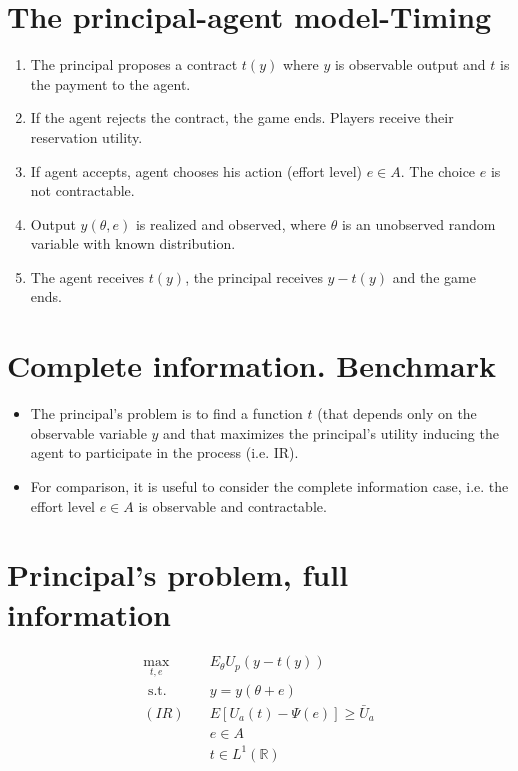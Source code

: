 \documentclass[10pt]{article}
\begin{document}
\section*{The principal-agent model-Timing}
\begin{enumerate}
  \item The principal proposes a contract $t(y)$ where $y$ is observable output and $t$ is the payment to the agent.
  \item If the agent rejects the contract, the game ends. Players receive their reservation utility.
  \item If agent accepts, agent chooses his action (effort level) $e \in A$. The choice $e$ is not contractable.
  \item Output $y(\theta, e)$ is realized and observed, where $\theta$ is an unobserved random variable with known distribution.
  \item The agent receives $t(y)$, the principal receives $y-t(y)$ and the game ends.
\end{enumerate}

\section*{Complete information. Benchmark}
\begin{itemize}
  \item The principal's problem is to find a function $t$ (that depends only on the observable variable $y$ and that maximizes the principal's utility inducing the agent to participate in the process (i.e. IR).
  \item For comparison, it is useful to consider the complete information case, i.e. the effort level $e \in A$ is observable and contractable.
\end{itemize}

\section*{Principal's problem, full information}
$$
\begin{aligned}
\max _{t, e} & E_{\theta} U_{p}(y-t(y)) \\
\text { s.t. } & y=y(\theta+e) \\
(I R) \quad & E\left[U_{a}(t)-\Psi(e)\right] \geq \bar{U}_{a} \\
& e \in A \\
& t \in L^{1}(\mathbb{R})
\end{aligned}
$$
\end{document}
